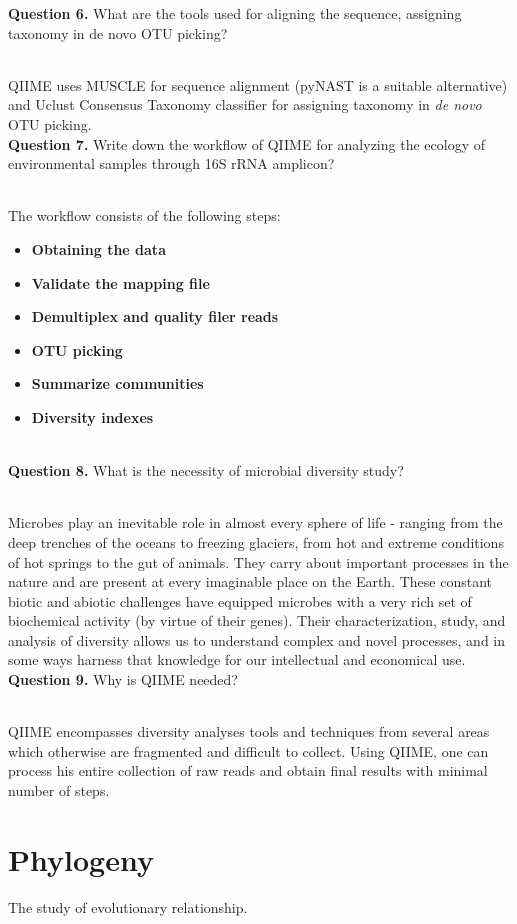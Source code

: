 \documentclass[12pt,a4paper]{report}
\begin{document}
\noindent
\textbf{Question 6.} What are the tools used for aligning the sequence, 
assigning taxonomy in de novo OTU picking?

\subparagraph{} QIIME uses MUSCLE for sequence alignment (pyNAST is a suitable 
alternative) and Uclust Consensus Taxonomy classifier for assigning taxonomy in 
\textit{de novo} OTU picking.\mbox{}\\

\noindent
\textbf{Question 7.} Write down the workflow of QIIME for analyzing the ecology 
of environmental samples through 16S rRNA amplicon?

\subparagraph{} The workflow consists of the following steps:
\begin{itemize}
    \item \textbf{Obtaining the data}
    \item \textbf{Validate the mapping file}
    \item \textbf{Demultiplex and quality filer reads}
    \item \textbf{OTU picking}
    \item \textbf{Summarize communities}
    \item \textbf{Diversity indexes}
\end{itemize}\mbox{}\\

\noindent
\textbf{Question 8.} What is the necessity of microbial diversity study?
\subparagraph{} Microbes play an inevitable role in almost every sphere of life 
- ranging from the deep trenches of the oceans to freezing glaciers, from hot 
and extreme conditions of hot springs to the gut of animals. They carry about
important processes in the nature and are present at every imaginable place on
the Earth. These constant biotic and abiotic challenges have equipped microbes
with a very rich set of biochemical activity (by virtue of their genes). Their 
characterization, study, and analysis of diversity allows us to understand 
complex and novel processes, and in some ways harness that knowledge for our 
intellectual and economical use.\mbox{}\\

\noindent
\textbf{Question 9.} Why is QIIME needed?
\subparagraph{} QIIME encompasses diversity analyses tools and techniques from 
several areas which otherwise are fragmented and difficult to collect. Using 
QIIME, one can process his entire collection of raw reads and obtain final 
results with minimal number of steps.

\chapter*{Phylogeny}
The study of evolutionary relationship.
\end{document}
